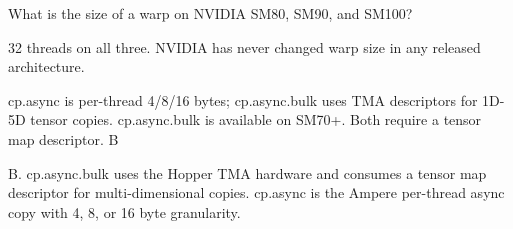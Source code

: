 \documentclass[problemset]{solution}
\begin{document}
\maketitle

What is the size of a warp on NVIDIA SM80, SM90, and SM100?
\begin{solutionbox}
	32 threads on all three. NVIDIA has never changed warp size in any released architecture.
\end{solutionbox}

{cp.async is per-thread 4/8/16 bytes; cp.async.bulk uses TMA descriptors for 1D-5D tensor copies.}
{cp.async.bulk is available on SM70+.}
{Both require a tensor map descriptor.}
{B}

\begin{solutionbox}
	B. cp.async.bulk uses the Hopper TMA hardware and consumes a tensor map descriptor for
	multi-dimensional copies. cp.async is the Ampere per-thread async copy with 4, 8, or 16
	byte granularity.
\end{solutionbox}
\end{document}
